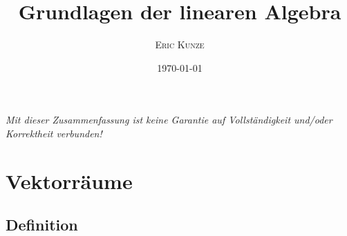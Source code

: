 \documentclass[ngerman, a4paper, 12pt]{scrreprt}
\theoremstyle{plain}
\theoremstyle{proofstyle}
\begin{document}
	\title{\bfseries \sffamily \huge Grundlagen der linearen Algebra}
	\author{\scshape Eric Kunze}
	\date{\today}
	\maketitle
	
	\pagebreak
	
	{ \footnotesize \doclicenseThis }
	
	\begin{center}
		\small \slshape Mit dieser Zusammenfassung ist keine Garantie auf Vollständigkeit und/oder Korrektheit verbunden!
	\end{center}
	
	\pagebreak
	
	\tableofcontents
	
	
\chapter{Vektorräume}

\section{Definition}
	
\end{document}
